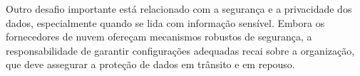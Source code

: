 Outro desafio importante está relacionado com a segurança e a privacidade dos dados, especialmente quando se lida com informação sensível. Embora os fornecedores de nuvem ofereçam mecanismos robustos de segurança, a responsabilidade de garantir configurações adequadas recai sobre a organização, que deve assegurar a proteção de dados em trânsito e em repouso.
